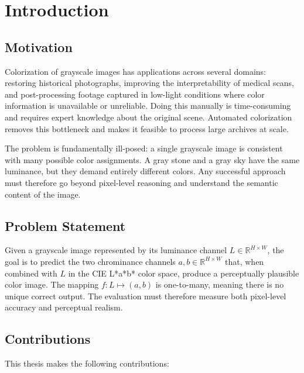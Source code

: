\documentclass[12pt, a4paper, oneside]{report}
\begin{document}
\chapter{Introduction}

\section{Motivation}

Colorization of grayscale images has applications across several domains: restoring
historical photographs, improving the interpretability of medical scans, and
post-processing footage captured in low-light conditions where color information
is unavailable or unreliable. Doing this manually is time-consuming and requires
expert knowledge about the original scene. Automated colorization removes this
bottleneck and makes it feasible to process large archives at scale.

The problem is fundamentally ill-posed: a single grayscale image is consistent with
many possible color assignments. A gray stone and a gray sky have the same luminance,
but they demand entirely different colors. Any successful approach must therefore go
beyond pixel-level reasoning and understand the semantic content of the image.

\section{Problem Statement}

Given a grayscale image represented by its luminance channel $L \in \mathbb{R}^{H \times W}$,
the goal is to predict the two chrominance channels $a, b \in \mathbb{R}^{H \times W}$
that, when combined with $L$ in the CIE L*a*b* color space, produce a perceptually
plausible color image. The mapping $f: L \mapsto (a, b)$ is one-to-many, meaning
there is no unique correct output. The evaluation must therefore measure both
pixel-level accuracy and perceptual realism.

\section{Contributions}

This thesis makes the following contributions:
\end{document}
